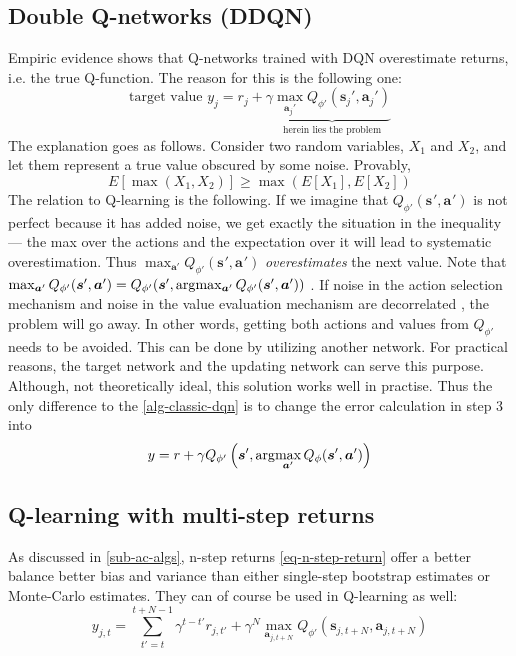 \subsection{Double Q-networks (DDQN)}
Empiric evidence shows that Q-networks trained with DQN overestimate returns, i.e.
the true Q-function. The reason for this is the following one:
\begin{equation}
		\text{target value } y_j = r_j + \gamma \underbrace{ \max_{\bm{a}_j'} Q_{\phi'}(\bm{s}_{j}', \bm{a}_{j}')}_{\text{herein lies the problem}}
\end{equation}
The explanation goes as follows.
Consider two random variables, $X_1$ and $X_2$, and let them represent a true value obscured by some noise.
Provably,
\begin{equation}
		E \left[ \max (X_1, X_2) \right] \geq \max	\left( E[X_1], E[X_2] \right) 
\end{equation}
The relation to Q-learning is the following.
If we imagine that $Q_{\phi'}(\bm{s}_{}', \bm{a}_{}')$ is not perfect because it has added noise,
we get exactly the situation in the inequality --- the max over the actions and the expectation
over it will lead to systematic overestimation.
Thus $\max_{\bm{a}'} Q_{\phi'}(\bm{s}_{}', \bm{a}_{}')$ \textit{overestimates} the next value.
Note that $\max_{\bm{a}'} Q_{\phi'}(\bm{s}_{}', \bm{a}_{}') = Q_{\phi'} (\bm{s}', \arg\!\max_{\bm{a}'}Q_{\phi'}(\bm{s}', \bm{a}'))$ .
If noise in the action selection mechanism and noise in the value evaluation
mechanism are decorrelated , the problem will go away. In other words, getting both actions and values from $Q_{\phi'}$
needs to be avoided. This can be done by utilizing another network.
For practical reasons, the target network and the updating network can serve this purpose.
Although, not theoretically ideal, this solution works well in practise.
Thus the only difference to the \ref{alg-classic-dqn} is to change the error calculation in step 3 into
\begin{equation}
		y = r + \gamma Q_{\phi'}\left( \bm{s}', \arg\!\max_{\bm{a}'}Q_{\phi}(\bm{s}_{}', \bm{a}_{}') \right)
\end{equation}


\subsection{Q-learning with multi-step returns}
As discussed in \ref{sub-ac-algs}, n-step returns \ref{eq-n-step-return} offer a better balance better bias and variance 
than either single-step bootstrap
estimates or Monte-Carlo estimates.
They can of course be used in Q-learning as well:
\begin{equation}
		y_{j,t} = \sum_{t'=t}^{t+N-1} \gamma^{t-t'}    r_{j,t'} + \gamma^N  \max_{\bm{a}_{j,t+N}}Q_{\phi'}(\bm{s}_{j,t+N}, \bm{a}_{j,t+N}) 
\end{equation}




